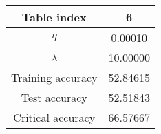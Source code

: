 \begin{tabular}{cc}
\hline \hline
Table index &        6 \\
\hline \hline
$\eta$            &  0.00010 \\
$\lambda$         & 10.00000 \\
Training accuracy & 52.84615 \\
Test accuracy     & 52.51843 \\
Critical accuracy & 66.57667 \\
\hline \hline
\end{tabular}
